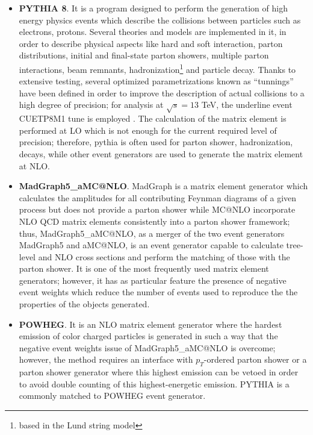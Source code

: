 \begin{itemize}

\item \textbf{PYTHIA 8}. It is a program designed to perform the generation of high energy physics events which describe the collisions between particles such as electrons, protons. Several theories and models are implemented in it, in order to describe physical aspects like hard and soft interaction, parton distributions, initial and final-state parton showers, multiple parton interactions, beam remnants, hadronization\footnote{based in the Lund string model\cite{lund}} and particle decay. Thanks to extensive testing, several optimized parametrizations known as ``tunnings'' have been defined in order to improve the description of actual collisions to a high degree of precision; for analysis at $\sqrt{s}=13$ TeV, the underline event CUETP8M1 tune is employed \cite{tune}.  The calculation of the matrix element is performed at LO which is not enough for the current required level of precision; therefore, pythia is often used for parton shower, hadronization, decays, while other event generators are used to generate the matrix element at NLO.
\item \textbf{MadGraph5\_aMC@NLO}. MadGraph is a matrix element generator which calculates the amplitudes for all contributing Feynman diagrams of a given process but does not provide a parton shower while MC@NLO incorporate NLO QCD matrix elements consistently into a parton shower framework; thus, MadGraph5\_aMC@NLO, as a merger of the two event generators MadGraph5 and aMC@NLO, is an event generator capable to calculate tree-level and NLO cross sections and perform the matching of those with the parton shower. It is one of the most frequently used matrix element generators; however, it has as particular feature the presence of negative event weights which reduce the number of events used to reproduce the the properties of the objects generated\cite{madgraph}.\\
\item \textbf{POWHEG}. It is an NLO matrix element generator where the hardest emission of color charged particles is generated in such a way that the negative event weights issue of MadGraph5\_aMC@NLO is overcome; however, the method requires an interface with  $p_T$-ordered parton shower or a parton shower generator where this highest emission can be vetoed in order to avoid double counting of this highest-energetic emission. PYTHIA is a commonly matched to POWHEG event generator\cite{powheg}.
\end{itemize}

